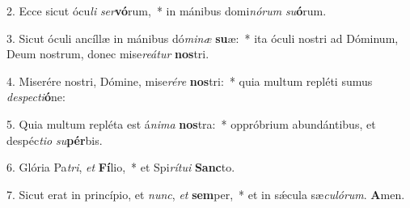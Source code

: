 2. Ecce sicut ócu\textit{li} \textit{ser}\textbf{vó}rum,~*  in mánibus domi\textit{nó}\textit{rum} \textit{su}\textbf{ó}rum.\

3. Sicut óculi ancíllæ in mánibus dó\textit{mi}\textit{næ} \textbf{su}æ:~*  ita óculi nostri ad Dóminum, Deum nostrum, donec mise\textit{re}\textit{á}\textit{tur} \textbf{nos}tri.\

4. Miserére nostri, Dómine, mise\textit{ré}\textit{re} \textbf{nos}tri:~*  quia multum repléti sumus \textit{de}\textit{spec}\textit{ti}\textbf{ó}ne:\

5. Quia multum repléta est á\textit{ni}\textit{ma} \textbf{nos}tra:~*  oppróbrium abundántibus, et despéc\textit{ti}\textit{o} \textit{su}\textbf{pér}bis.\

6. Glória Pa\textit{tri}, \textit{et} \textbf{Fí}lio,~*  et Spi\textit{rí}\textit{tu}\textit{i} \textbf{Sanc}to.\

7. Sicut erat in princípio, et \textit{nunc}, \textit{et} \textbf{sem}per,~*  et in sǽcula sæ\textit{cu}\textit{ló}\textit{rum}. \textbf{A}men.\

